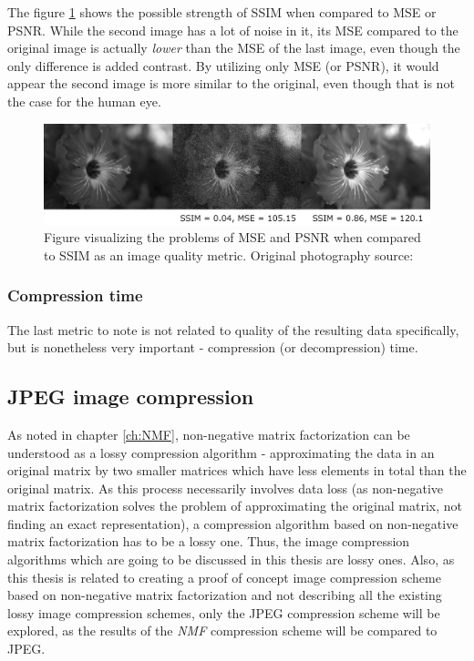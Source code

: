 \documentclass[thesis=M,english]{FITthesis}[2012/10/20]
\begin{document}
The figure \ref{fig:ssimmse} shows the possible strength of SSIM when compared to
MSE or PSNR. While the second image has a lot of noise in it, its MSE compared to
the original image is actually \emph{lower} than the MSE of the last image, even
though the only difference is added contrast. By utilizing only MSE (or PSNR), it
would appear the second image is more similar to the original, even though that
is not the case for the human eye.

\begin{figure}[h]
  \centering
  \includegraphics[scale=0.62]{imgs/flower_mse_psnr_ssim}
  \caption[Problems of MSE and PSNR as lossy compression quality metrics]{Figure visualizing the problems of MSE and PSNR when compared to
           SSIM as an image quality metric. Original photography source: \cite{imgcomprbenchmark}}
  \label{fig:ssimmse}
\end{figure}

\subsubsection{Compression time}
The last metric to note is not related to quality of the resulting data specifically,
but is nonetheless very important - compression (or decompression) time.

\subsection{JPEG image compression}
As noted in chapter \ref{ch:NMF}, non-negative matrix factorization can
be understood as a lossy compression algorithm - approximating the
data in an original matrix by two smaller matrices which have less
elements in total than the original matrix. As this process necessarily
involves data loss (as non-negative matrix factorization solves the problem
of approximating the original matrix, not finding an exact representation),
a compression algorithm based on non-negative matrix factorization has to be
a lossy one. Thus, the image compression algorithms which are going to be
discussed in this thesis are lossy ones. Also, as this thesis is related
to creating a proof of concept image compression scheme based on non-negative
matrix factorization and not describing all the existing lossy image
compression schemes, only the JPEG compression scheme will be explored,
as the results of the \emph{NMF} compression scheme will be compared to
JPEG.
\end{document}
